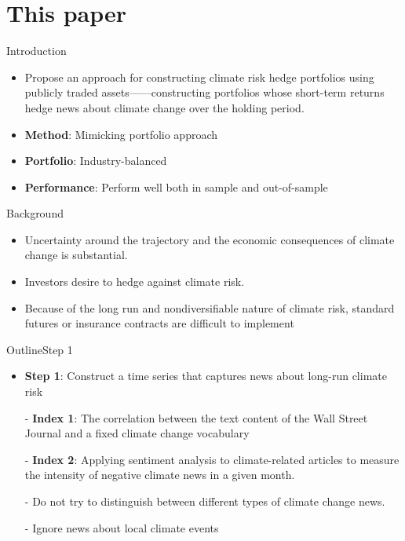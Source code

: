 \section{This paper}
\begin{frame}{Introduction}
	\begin{itemize}
		\item Propose an approach for constructing climate risk hedge portfolios using publicly traded assets——constructing portfolios whose short-term returns hedge news about climate change over the holding period.
		\item \textbf{Method}: Mimicking portfolio approach
		\item \textbf{Portfolio}: Industry-balanced
		\item \textbf{Performance}: Perform well both in sample and out-of-sample
	\end{itemize}
\end{frame}
	
\begin{frame}{Background}
	\begin{itemize}
		\item Uncertainty around the trajectory and the economic consequences of climate change is substantial.
		\item Investors desire to hedge against climate risk.
		\item Because of the long run and nondiversifiable nature of climate risk, standard futures or insurance contracts are difficult to implement	
	\end{itemize}
\end{frame}
	
\begin{frame}{Outline}{Step 1}
	\begin{itemize}
		\item \textbf{Step 1}: Construct a time series that captures news about long-run climate risk
		\item [-] \textbf{Index 1}: The correlation between the text content of the Wall Street Journal and a fixed climate change vocabulary
		\item [-] \textbf{Index 2}: Applying sentiment analysis to climate-related articles to measure the intensity of negative climate news in a given month.
		\item [-]Do not try to distinguish between different types of climate change news.
		\item [-]Ignore news about local climate events
	\end{itemize}	
\end{frame}
	
